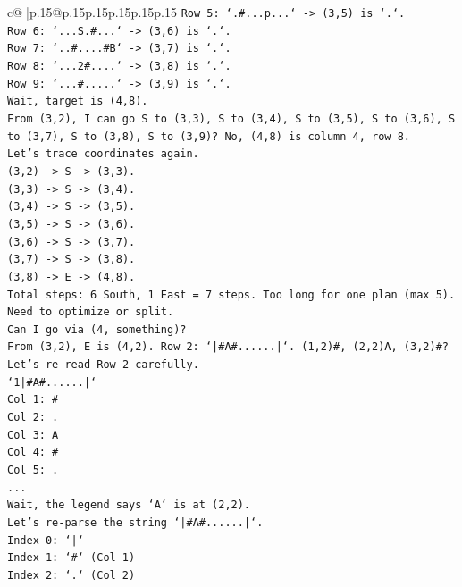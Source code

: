 \documentclass{article}
\begin{document}
{\begin{supertabular}{c@{$\;$}|p{.15\linewidth}@{}p{.15\linewidth}p{.15\linewidth}p{.15\linewidth}p{.15\linewidth}p{.15\linewidth}}
{{{\texttt{Row 5: `.\#...p...` {-}> (3,5) is `.`.} \\
\texttt{Row 6: `...S.\#...` {-}> (3,6) is `.`.} \\
\texttt{Row 7: `..\#....\#B` {-}> (3,7) is `.`.} \\
\texttt{Row 8: `...2\#....` {-}> (3,8) is `.`.} \\
\texttt{Row 9: `...\#.....` {-}> (3,9) is `.`.} \\
\texttt{Wait, target is (4,8).} \\
\texttt{From (3,2), I can go S to (3,3), S to (3,4), S to (3,5), S to (3,6), S to (3,7), S to (3,8), S to (3,9)? No, (4,8) is column 4, row 8.} \\
\texttt{Let's trace coordinates again.} \\
\texttt{(3,2) {-}> S {-}> (3,3).} \\
\texttt{(3,3) {-}> S {-}> (3,4).} \\
\texttt{(3,4) {-}> S {-}> (3,5).} \\
\texttt{(3,5) {-}> S {-}> (3,6).} \\
\texttt{(3,6) {-}> S {-}> (3,7).} \\
\texttt{(3,7) {-}> S {-}> (3,8).} \\
\texttt{(3,8) {-}> E {-}> (4,8).} \\
\texttt{Total steps: 6 South, 1 East = 7 steps. Too long for one plan (max 5).} \\
\texttt{Need to optimize or split.} \\
\texttt{Can I go via (4, something)?} \\
\texttt{From (3,2), E is (4,2). Row 2: `|\#A\#......|`. (1,2)\#, (2,2)A, (3,2)\#?} \\
\texttt{Let's re{-}read Row 2 carefully.} \\
\texttt{`1|\#A\#......|`} \\
\texttt{Col 1: \#} \\
\texttt{Col 2: .} \\
\texttt{Col 3: A} \\
\texttt{Col 4: \#} \\
\texttt{Col 5: .} \\
\texttt{...} \\
\texttt{Wait, the legend says `A` is at (2,2).} \\
\texttt{Let's re{-}parse the string `|\#A\#......|`.} \\
\texttt{Index 0: `|`} \\
\texttt{Index 1: `\#` (Col 1)} \\
\texttt{Index 2: `.` (Col 2)} \\
}}}
\end{supertabular}}
\end{document}
